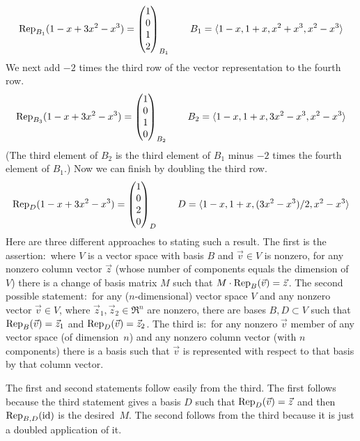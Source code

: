 \begin{exercises}
\begin{answer}
\begin{exparts}
\begin{equation*}
            \rep{1-x+3x^2-x^3}{B_1}=
              \colvec{1 \\ 0 \\ 1 \\ 2}_{B_1}
            \qquad
            B_1=\sequence{1-x,1+x,x^2+x^3,x^2-x^3}
          \end{equation*}
          We next add \( -2 \) times the third row of the vector
          representation to the fourth row.
          \begin{equation*}
            \rep{1-x+3x^2-x^3}{B_3}=
              \colvec{1 \\ 0 \\ 1 \\ 0}_{B_2}
            \qquad
            B_2=\sequence{1-x,1+x,3x^2-x^3,x^2-x^3}
          \end{equation*}
          (The third element of \( B_2 \) is the third element of 
          \( B_1 \) minus \( -2 \) times the fourth element of $B_1$.)
          Now we can finish by doubling the third row.
          \begin{equation*}
            \rep{1-x+3x^2-x^3}{D}=
              \colvec{1 \\ 0 \\ 2 \\ 0}_{D}
            \qquad
            D=\sequence{1-x,1+x,(3x^2-x^3)/2,x^2-x^3}
          \end{equation*}
        \partsitem 
          Here are three different approaches to stating such a result.
          The first is the assertion:~where $V$ is a vector space with
          basis $B$ and $\vec{v}\in V$ is nonzero, for any nonzero column
          vector $\vec{z}$ 
          (whose number of components equals the dimension of $V$) 
          there is a change of basis matrix $M$ such that
          $M\cdot \rep{\vec{v}}{B}=\vec{z}$. 
          The second possible statement:~for any ($n$-dimensional)
          vector space $V$ and any nonzero
          vector \( \vec{v}\in V \), where \( \vec{z}_1, \vec{z}_2\in\Re^n \)
          are nonzero, there are bases \( B, D\subset V \) such that
          \( \rep{\vec{v}}{B}=\vec{z}_1 \) and 
          \( \rep{\vec{v}}{D}=\vec{z}_2 \).
          The third is:~for any nonzero $\vec{v}$ member of 
          any vector space (of dimension~$n$) and any nonzero column vector
          (with $n$ components) there is a basis such that $\vec{v}$ is 
          represented with respect to that basis by that column vector.

          The first and second statements follow easily from the third.
          The first follows because the third statement gives a basis $D$
          such that $\rep{\vec{v}}{D}=\vec{z}$ and then 
          $\rep{\identity}{B,D}$ is the desired~$M$.
          The second follows from the third because it is just a
          doubled application of it.


\end{exparts}
\end{answer}
\end{exercises}
